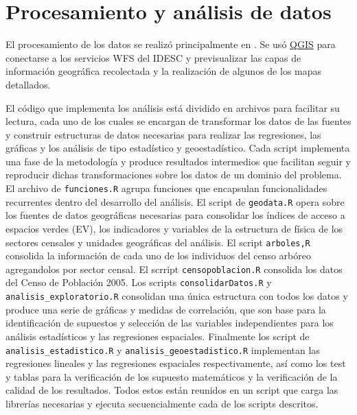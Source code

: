 \documentclass[12pt,]{book}
\begin{document}
\chapter{Procesamiento y análisis de datos}\label{anayproc}

El procesamiento de los datos se realizó principalmente en
\citet{R-base}. Se usó \href{http://www.qgis.org/es/site/}{QGIS} para
conectarse a los servicios WFS del IDESC y previsualizar las capas de
información geográfica recolectada y la realización de algunos de los
mapas detallados.

El código que implementa los análisis está dividido en archivos para
facilitar su lectura, cada uno de los cuales se encargan de transformar
los datos de las fuentes y construir estructuras de datos necesarias
para realizar las regresiones, las gráficas y los análisis de tipo
estadístico y geoestadístico. Cada script implementa una fase de la
metodología y produce resultados intermedios que facilitan seguir y
reproducir dichas transformaciones sobre los datos de un dominio del
problema. El archivo de \texttt{funciones.R} agrupa funciones que
encapsulan funcionalidades recurrentes dentro del desarrollo del
análisis. El script de \texttt{geodata.R} opera sobre los fuentes de
datos geográficas necesarias para consolidar los índices de acceso a
espacios verdes (EV), los indicadores y variables de la estructura de
física de los sectores censales y unidades geográficas del análisis. El
script \texttt{arboles,R} consolida la información de cada uno de los
individuos del censo arbóreo agregandolos por sector censal. El scrript
\texttt{censopoblacion.R} consolida los datos del Censo de Población
2005. Los scripts \texttt{consolidarDatos.R} y
\texttt{analisis\_exploratorio.R} consolidan una única estructura con
todos los datos y produce una serie de gráficas y medidas de
correlación, que son base para la identificación de supuestos y
selección de las variables independientes para los análisis estadísticos
y las regresiones espaciales. Finalmente los script de
\texttt{analisis\_estadistico.R} y \texttt{analisis\_geoestadistico.R}
implementan las regresiones lineales y las regresiones espaciales
respectivamente, así como los test y tablas para la verificación de los
supuesto matemáticos y la verificación de la calidad de los resultados.
Todos estos están reunidos en un script que carga las librerías
necesarias y ejecuta secuencialmente cada de los scripts descritos.
\end{document}

